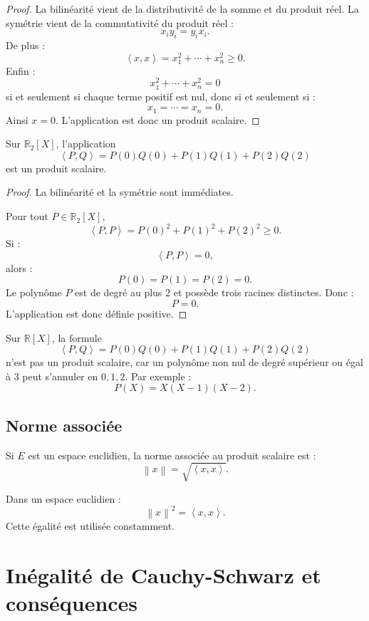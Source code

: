 \documentclass[11pt,a4paper]{article}
\newcommand{\R}{\mathbb R}
\newcommand{\norme}[1]{\left\lVert #1\right\rVert}
\newcommand{\scal}[2]{\left\langle #1,#2\right\rangle}
\begin{document}
\begin{proof}
La bilinéarité vient de la distributivité de la somme et du produit réel.  
La symétrie vient de la commutativité du produit réel :
\[
x_iy_i=y_ix_i.
\]
De plus :
\[
\scal{x}{x}=x_1^2+\cdots+x_n^2\geq0.
\]
Enfin :
\[
x_1^2+\cdots+x_n^2=0
\]
si et seulement si chaque terme positif est nul, donc si et seulement si :
\[
x_1=\cdots=x_n=0.
\]
Ainsi \(x=0\).  
L'application est donc un produit scalaire.
\end{proof}

\begin{theorembox}
Sur \(\R_2[X]\), l'application
\[
\scal{P}{Q}=P(0)Q(0)+P(1)Q(1)+P(2)Q(2)
\]
est un produit scalaire.
\end{theorembox}

\begin{proof}
La bilinéarité et la symétrie sont immédiates.

Pour tout \(P\in\R_2[X]\),
\[
\scal{P}{P}=P(0)^2+P(1)^2+P(2)^2\geq0.
\]
Si :
\[
\scal{P}{P}=0,
\]
alors :
\[
P(0)=P(1)=P(2)=0.
\]
Le polynôme \(P\) est de degré au plus \(2\) et possède trois racines distinctes.  
Donc :
\[
P=0.
\]
L'application est donc définie positive.
\end{proof}

\begin{erreurbox}
Sur \(\R[X]\), la formule
\[
\scal{P}{Q}=P(0)Q(0)+P(1)Q(1)+P(2)Q(2)
\]
n'est pas un produit scalaire, car un polynôme non nul de degré supérieur ou égal à \(3\) peut s'annuler en \(0,1,2\).  
Par exemple :
\[
P(X)=X(X-1)(X-2).
\]
\end{erreurbox}

\subsection{Norme associée}

\begin{definitionbox}
Si \(E\) est un espace euclidien, la norme associée au produit scalaire est :
\[
\norme{x}=\sqrt{\scal{x}{x}}.
\]
\end{definitionbox}

\begin{retenirbox}
Dans un espace euclidien :
\[
\norme{x}^2=\scal{x}{x}.
\]
Cette égalité est utilisée constamment.
\end{retenirbox}

\section{Inégalité de Cauchy-Schwarz et conséquences}
\end{document}
